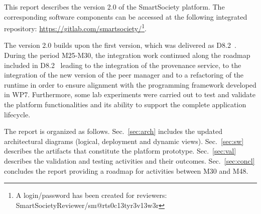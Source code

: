 This report describes the version 2.0 of the SmartSociety platform. The corresponding software components can be accessed at the following integrated repository:
\url{https://gitlab.com/smartsociety/}\footnote{A login/password has been created for reviewers: SmartSocietyReviewer/sm@rts0c13tyr3v13w3r}.%

The version 2.0 builds upon the first version, which was delivered as D8.2~\cite{D8.1}. During the period M25-M30, the integration work continued along the roadmap included in D8.2~\cite{D8.2} leading to the integration of the provenance service, to the integration of the new version of the peer manager and to a refactoring of the runtime in order to ensure alignment with the programming framework developed in WP7. Furthermore, some lab experiments were carried out to test and validate the platform functionalities and its ability to support the complete application lifecycle. 

The report is organized as follows. Sec.~\ref{sec:arch} includes the updated architectural diagrams (logical, deployment and dynamic views). Sec.~\ref{sec:sw} describes the artifacts that constitute the platform prototype. Sec.~\ref{sec:val} describes the validation and testing activities and their outcomes. Sec.~\ref{sec:concl} concludes the report providing a roadmap for activities between M30 and M48.



